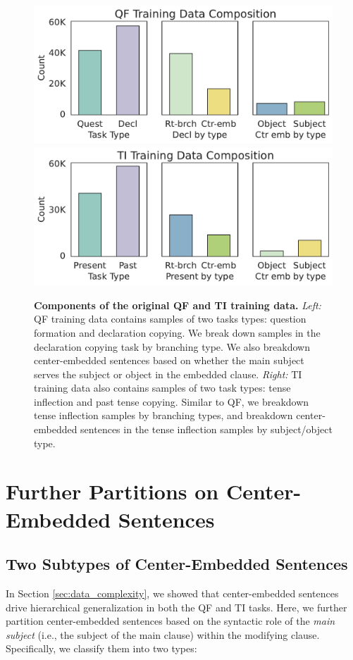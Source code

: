 \begin{figure}[t!]
    \centering
    \includegraphics[width=0.49\linewidth]{figures/qf_data_composition.pdf}
    \includegraphics[width=0.49\linewidth]{figures/ti_data_composition.pdf}
    \caption{\textbf{Components of the original QF and TI training data.} 
    \textit{Left:} QF training data contains samples of two tasks types: question formation and declaration copying. We break down samples in the declaration copying task by branching type. We also breakdown center-embedded sentences based on whether the main subject serves the subject or object in the embedded clause.
    \textit{Right:} TI training data also contains samples of two task types: tense inflection and past tense copying. Similar to QF, we breakdown tense inflection samples by branching types, and breakdown center-embedded sentences in the tense inflection samples by subject/object type. 
    }
    \label{fig:data_detail}
\end{figure}

\section{Further Partitions on Center-Embedded Sentences}
\label{appdx:obj_sbj_ctr_breakdown}

\subsection{Two Subtypes of Center-Embedded Sentences}
In Section \ref{sec:data_complexity}, we showed that center-embedded sentences drive hierarchical generalization in both the QF and TI tasks. Here, we further partition center-embedded sentences based on the syntactic role of the \textit{main subject} (i.e., the subject of the main clause) within the modifying clause. Specifically, we classify them into two types:

